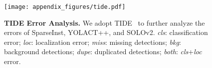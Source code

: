 \documentclass[10pt,twocolumn,letterpaper]{article}
\begin{document}
\begin{figure}[h]
    \centering
    \texttt{[image: appendix\_figures/tide.pdf]}
    \caption{\textbf{TIDE Error Analysis.} We adopt TIDE~\cite{tide-eccv2020} to further analyze the errors of SparseInst, YOLACT++, and SOLOv2. \textit{cls}: classification error; \textit{loc}: localization error; \textit{miss}: missing detections; \textit{bkg}: background detections; \textit{dupe}: duplicated detections; \textit{both}: \textit{cls}+\textit{loc} error.}
    \label{fig:tide}
\end{figure}
\end{document}
